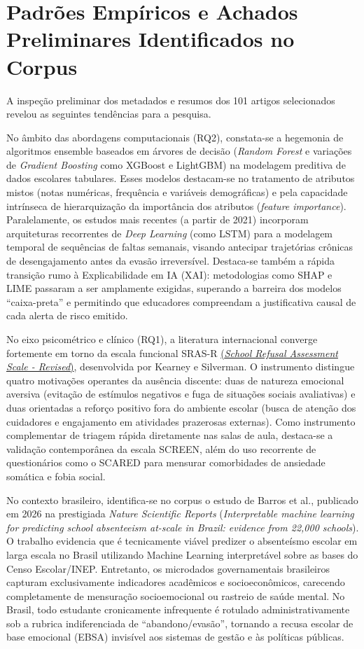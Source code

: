 \documentclass[10pt,a4paper]{article}
\begin{document}
\section{Padrões Empíricos e Achados Preliminares Identificados no Corpus}
A inspeção preliminar dos metadados e resumos dos 101 artigos selecionados revelou as seguintes tendências para a pesquisa.

No âmbito das abordagens computacionais (RQ2), constata-se a hegemonia de algoritmos ensemble baseados em árvores de decisão (\textit{Random Forest} e variações de \textit{Gradient Boosting} como XGBoost e LightGBM) na modelagem preditiva de dados escolares tabulares. Esses modelos destacam-se no tratamento de atributos mistos (notas numéricas, frequência e variáveis demográficas) e pela capacidade intrínseca de hierarquização da importância dos atributos (\textit{feature importance}). Paralelamente, os estudos mais recentes (a partir de 2021) incorporam arquiteturas recorrentes de \textit{Deep Learning} (como LSTM) para a modelagem temporal de sequências de faltas semanais, visando antecipar trajetórias crônicas de desengajamento antes da evasão irreversível. Destaca-se também a rápida transição rumo à Explicabilidade em IA (XAI): metodologias como SHAP e LIME passaram a ser amplamente exigidas, superando a barreira dos modelos ``caixa-preta'' e permitindo que educadores compreendam a justificativa causal de cada alerta de risco emitido.

No eixo psicométrico e clínico (RQ1), a literatura internacional converge fortemente em torno da escala funcional SRAS-R \hyperlink{https://sphsoutcomes.net/node/506}{(\textit{School Refusal Assessment Scale - Revised})}, desenvolvida por Kearney e Silverman. O instrumento distingue quatro motivações operantes da ausência discente: duas de natureza emocional aversiva (evitação de estímulos negativos e fuga de situações sociais avaliativas) e duas orientadas a reforço positivo fora do ambiente escolar (busca de atenção dos cuidadores e engajamento em atividades prazerosas externas). Como instrumento complementar de triagem rápida diretamente nas salas de aula, destaca-se a validação contemporânea da escala SCREEN, além do uso recorrente de questionários como o SCARED para mensurar comorbidades de ansiedade somática e fobia social.

No contexto brasileiro, identifica-se no corpus o estudo de Barros et al., publicado em 2026 na prestigiada \textit{Nature Scientific Reports} (\textit{Interpretable machine learning for predicting school absenteeism at-scale in Brazil: evidence from 22,000 schools}). O trabalho evidencia que é tecnicamente viável predizer o absenteísmo escolar em larga escala no Brasil utilizando Machine Learning interpretável sobre as bases do Censo Escolar/INEP. Entretanto, os microdados governamentais brasileiros capturam exclusivamente indicadores acadêmicos e socioeconômicos, carecendo completamente de mensuração socioemocional ou rastreio de saúde mental. No Brasil, todo estudante cronicamente infrequente é rotulado administrativamente sob a rubrica indiferenciada de ``abandono/evasão'', tornando a recusa escolar de base emocional (EBSA) invisível aos sistemas de gestão e às políticas públicas.
\end{document}
